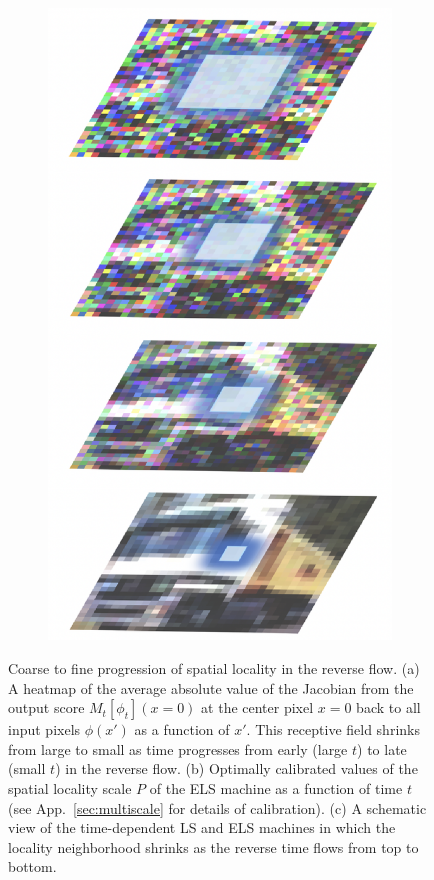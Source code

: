 \documentclass{article}
\theoremstyle{plain}
\theoremstyle{definition}
\theoremstyle{remark}
\begin{document}
\begin{figure}
\begin{subfigure}[b]{0.16\linewidth}
    \includegraphics[width=\linewidth,valign=b]{multiscale.png}
    \vspace{-1em}
    \caption{}
    \label{fig:scales_jacobianc}
    \end{subfigure}
    \vspace{-1em}
    \caption{Coarse to fine progression of spatial locality in the reverse flow. (a) A heatmap of the average absolute value of the Jacobian from the output score $M_t[\phi_t](x=0)$ at the center pixel $x=0$ back to all input pixels $\phi(x')$ as a function of $x'$.  This receptive field shrinks from large to small as time progresses from early (large $t$) to late (small $t$) in the reverse flow. (b) Optimally calibrated values of the spatial locality scale $P$ of the ELS machine as a function of time $t$ (see App.~\ref{sec:multiscale} for details of calibration). (c) A schematic view of the time-dependent LS and ELS machines in which the locality neighborhood shrinks as the reverse time flows from top to bottom.}

\end{figure}
\end{document}
